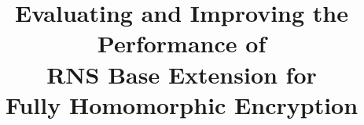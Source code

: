 \documentclass{sig-alternate}
\begin{document}
\title{Evaluating and Improving the Performance of\\RNS Base Extension for\\Fully Homomorphic Encryption}

\date{}
\maketitle

\thispagestyle{firstpage}
\pagestyle{plain}

\begin{abstract}
    
\end{abstract}










\end{document}
